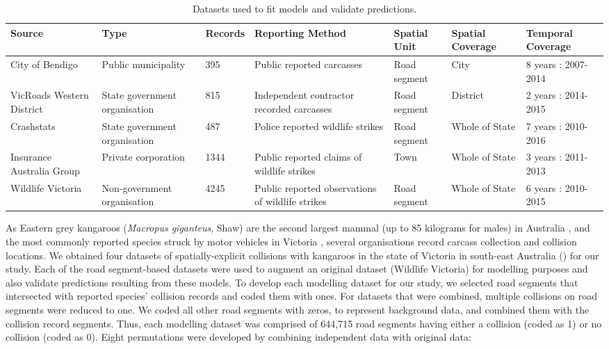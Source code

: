 \begin{table}[htp]
\caption[Datasets used to fit collision models and validate predictions]{Datasets used to fit models and validate predictions.}
\begin{tabularx}{\textwidth}{YYYYYYY} \toprule
Source						&Type							&Records	&Reporting Method	&Spatial Unit	&Spatial Coverage	&Temporal Coverage \\ \midrule
City of Bendigo				&Public municipality			&395		&Public reported carcasses			&Road segment		&City	&8 years : 2007-2014 \\
VicRoads Western District	&State government organisation	&815		&Independent contractor recorded  carcasses			&Road segment		&District	&2 years : 2014-2015 \\
Crashstats					&State government organisation	&487		&Police reported wildlife strikes			&Road segment		&Whole of State	&7 years : 2010-2016 \\
Insurance Australia Group	&Private corporation			&1344		&Public reported claims of wildlife strikes			&Town		&Whole of State	&3 years : 2011-2013 \\
Wildlife Victoria			&Non-government organisation	&4245		&Public reported observations of wildlife strikes			&Road segment		&Whole of State	&6 years : 2010-2015 \\
\bottomrule
\end{tabularx}
\label{val_data}
\end{table}

As Eastern grey kangaroos (\textit{Macropus giganteus}, Shaw) are the second largest mammal (up to 85 kilograms for males) in Australia \citep{coul10}, and the most commonly reported species struck by motor vehicles in Victoria \citep{rowd08}, several organisations record carcass collection and collision locations. We obtained four datasets of spatially-explicit collisions with kangaroos in the state of Victoria in south-east Australia () for our study. Each of the road segment-based datasets were used to augment an original dataset (Wildlife Victoria) for modelling purposes and also validate predictions resulting from these models. To develop each modelling dataset for our study, we selected road segments that intersected with reported species’ collision records and coded them with ones. For datasets that were combined, multiple collisions on road segments were reduced to one. We coded all other road segments with zeros, to represent background data, and combined them with the collision record segments.  Thus, each modelling dataset was comprised of 644,715 road segments having either a collision (coded as 1) or no collision (coded as 0). Eight permutations were developed by combining independent data with original data:

